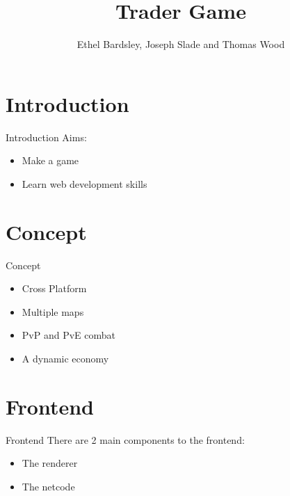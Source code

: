 
\usepackage{algorithm2e}
\usepackage{graphicx}
\usepackage[parfill]{parskip}
\usepackage{appendix}
\usepackage{amsmath}
\usepackage{multicol}

\title{Trader Game}
\author{Ethel Bardsley, Joseph Slade and Thomas Wood}



\begin{frame}
  \titlepage
\end{frame}

\section{Introduction}
\begin{frame}{Introduction}
  Aims:
    \begin{itemize}
      \item Make a game
      \item Learn web development skills
    \end{itemize}
\end{frame}

\section{Concept}
\begin{frame}{Concept}
  \begin{itemize}
    \item Cross Platform
    \item Multiple maps
    \item PvP and PvE combat
    \item A dynamic economy
  \end{itemize}
\end{frame}

\section{Frontend}
\begin{frame}{Frontend}
  There are 2 main components to the frontend:
  \begin{itemize}
    \item The renderer
    \item The netcode
  \end{itemize}
\end{frame}


